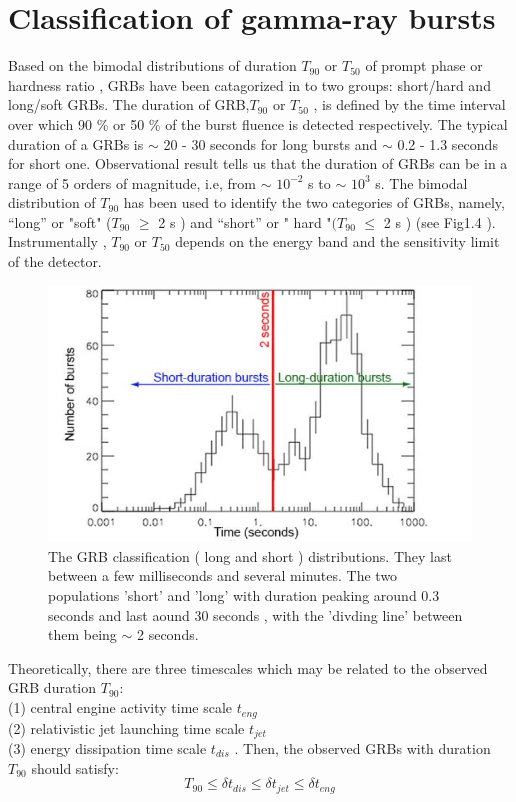 \section{Classification of gamma-ray bursts}
Based on the bimodal distributions of duration $ T_{90}$ or $ T_{50}$ of prompt phase or hardness ratio , GRBs have been catagorized in to two groups: short/hard and long/soft GRBs. The duration of GRB,$ T_{90} $ or $ T_{50}$  , is defined by the time interval over which 90 \%  or  50 \%  of the burst fluence is detected respectively. The typical duration of a GRBs is $\sim $ 20 - 30  seconds for long bursts and $\sim $ 0.2 - 1.3 seconds for short one. Observational result tells us that the duration of GRBs can be in a range of 5 orders of magnitude, i.e, from $\sim $ $ 10^{-2} $ s  to $\sim $ $ 10^{3} $ s. The bimodal distribution of $ T_{90} $ has been used to identify the two categories of GRBs, namely, “long” or "soft" ($ T_{90}$ $\geqslant $ 2  s ) and “short” or " hard "$( T_{90}$   $\leqslant$ 2 s ) (see Fig1.4 ). Instrumentally ,  $T_{90}$  or  $T_{50} $ depends on the energy band and the sensitivity limit of the detector.
\begin{figure}[h]
\begin{center}
\includegraphics[scale=0.4]{Figures/fig4.png}
\caption{The GRB classification ( long and short ) distributions. 	They  last between a few milliseconds and several minutes. The two populations 'short' and 'long'  with duration  peaking  around  0.3 seconds  and  last aound 30 seconds , with the  'divding line'  between them  being $ \sim $ 2 seconds. \citep{9}} 
\end{center}
\end{figure} 
Theoretically, there are three timescales which may be related to the observed GRB duration $ T_{90} $:\\
(1) central engine activity time scale $t_{eng}$\\
(2) relativistic jet launching time scale $t_{jet} $\\
(3) energy dissipation time scale $t_{dis}$ . Then, the observed GRBs with duration $  T_{90}$ should satisfy: \citep{5}
\begin{equation}
T_{90} \leq \delta  t_{dis} \leq\delta t_{jet} \leq \delta t_{eng} 
\end{equation}
